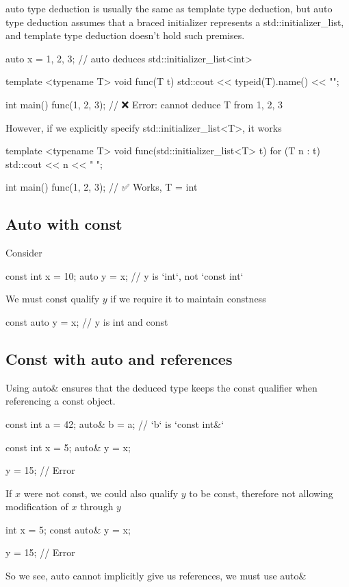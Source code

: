 \documentclass{report}
\begin{document}
\pagebreak 
{}
\bigbreak \noindent 
auto type deduction is usually the same as template type deduction, but auto type deduction assumes that a braced initializer represents a std::initializer\_list, and template type deduction doesn’t hold such premises.
\bigbreak \noindent 
\begin{cppcode}
    auto x = {1, 2, 3}; // auto deduces std::initializer_list<int>
\end{cppcode}
\bigbreak \noindent 
\begin{cppcode}
    template <typename T>
    void func(T t) {
        std::cout << typeid(T).name() << "\n";
    }

    int main() {
        func({1, 2, 3}); // ❌ Error: cannot deduce T from {1, 2, 3}
    }
\end{cppcode}
\bigbreak \noindent 
However, if we explicitly specify std::initializer\_list<T>, it works
\bigbreak \noindent 
\begin{cppcode}
    template <typename T>
    void func(std::initializer_list<T> t) {
        for (T n : t) {
            std::cout << n << " ";
        }
    }

    int main() {
        func({1, 2, 3}); // ✅ Works, T = int
    }
\end{cppcode}

\bigbreak \noindent 
\subsection{Auto with const}
\bigbreak \noindent 
Consider
\bigbreak \noindent 
\begin{cppcode}
    const int x = 10;
    auto y = x;   // y is `int`, not `const int`
\end{cppcode}
\bigbreak \noindent 
We must const qualify $y$ if we require it to maintain constness
\bigbreak \noindent 
\begin{cppcode}
const auto y = x; // y is int and const
\end{cppcode}


\bigbreak \noindent 
\subsection{Const with auto and references}
\bigbreak \noindent 
Using auto\& ensures that the deduced type keeps the const qualifier when referencing a const object.
\bigbreak \noindent 
\begin{cppcode}
const int a = 42;
auto& b = a;  // `b` is `const int&`
\end{cppcode}
\bigbreak \noindent 
\begin{cppcode}
    const int x = 5;
    auto& y = x;

    y = 15; // Error
\end{cppcode}
\bigbreak \noindent 
If $x$ were not const, we could also qualify $y$ to be const, therefore not allowing modification of $x$ through $y$
\bigbreak \noindent 
\begin{cppcode}
    int x = 5;
    const auto& y = x;

    y = 15; // Error
\end{cppcode}
\bigbreak \noindent 
So we see, auto cannot implicitly give us references, we must use auto\&
\end{document}

